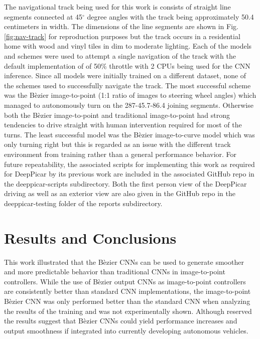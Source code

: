 \documentclass[conference]{IEEEtran}
\begin{document}
The navigational track being used for this work is consists of straight line segments connected at 45$^\circ$ degree angles with the track being approximately 50.4 centimeters in width. The dimensions of the line segments are shown in Fig. \ref{fig:nav-track} for reproduction purposes but the track occurs in a residential home with wood and vinyl tiles in dim to moderate lighting. Each of the models and schemes were used to attempt a single navigation of the track with the default implementation of \cite{bechtel2018} of 50\% throttle with 2 CPUs being used for the CNN inference. Since all models were initially trained on a different dataset, none of the schemes used to successfully navigate the track. The most successful scheme was the B\`ezier image-to-point (1:1 ratio of images to steering wheel angles) which managed to autonomously turn on the 287-45.7-86.4 joining segments. Otherwise both the B\`ezier image-to-point and traditional image-to-point had strong tendencies to drive straight with human intervention required for most of the turns. The least successful model was the B\`ezier image-to-curve model which was only turning right but this is regarded as an issue with the different track environment from training rather than a general performance behavior. For future repeatability, the associated scripts for implementing this work as required for DeepPicar by its previous work \cite{bechtel2018} are included in the associated GitHub repo in the deeppicar-scripts subdirectory. Both the first person view of the DeepPicar driving as well as an exterior view are also given in the GitHub repo in the deeppicar-testing folder of the reports subdirectory.

\section{Results and Conclusions}

This work illustrated that the B\`ezier CNNs can be used to generate smoother and more predictable behavior than traditional CNNs in image-to-point controllers. While the use of B\`ezier output CNNs as image-to-point controllers are consistently better than standard CNN implementations, the image-to-point B\`ezier CNN was only performed better than the standard CNN when analyzing the results of the training and was not experimentally shown. Although reserved the results suggest that B\`ezier CNNs could yield performance increases and output smoothness if integrated into currently developing autonomous vehicles.
\end{document}
